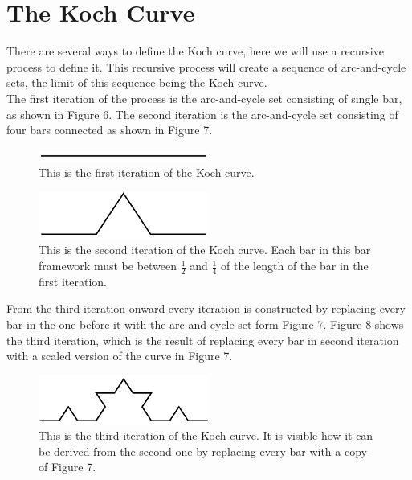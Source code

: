 \documentclass{article}
\theoremstyle{definition}
\begin{document}
\section{The Koch Curve}
There are several ways to define the Koch curve, here we will use a recursive process to define it. This recursive process will create a sequence of arc-and-cycle sets, the limit of this sequence being the Koch curve.\vspace{0.5em}\\
The first iteration of the process is the arc-and-cycle set consisting of single bar, as shown in Figure 6. The second iteration is the arc-and-cycle set consisting of four bars connected as shown in Figure 7.\vspace{0.5em}\\
\begin{figure}[H]
    \centering
    \includegraphics[width=0.5\textwidth]{Koch1.png}
    \caption{This is the first iteration of the Koch curve.}
\end{figure}
\begin{figure}[h]
    \centering
    \includegraphics[width=0.5\textwidth]{Koch2.png}
    \caption{This is the second iteration of the Koch curve. Each bar in this bar framework must be between $\frac{1}{2}$ and $\frac{1}{4}$ of the length of the bar in the first iteration.}
\end{figure}
\noindent From the third iteration onward every iteration is constructed by replacing every bar in the one before it with the arc-and-cycle set form Figure 7. Figure 8 shows the third iteration, which is the result of replacing every bar in second iteration with a scaled version of the curve in Figure 7.\vspace{0.5em}\\
\begin{figure}[h]
    \centering
    \includegraphics[width=0.5\textwidth]{Koch3.png}
    \caption{This is the third iteration of the Koch curve. It is visible how it can be derived from the second one by replacing every bar with a copy of Figure 7.}
\end{figure}
\end{document}
